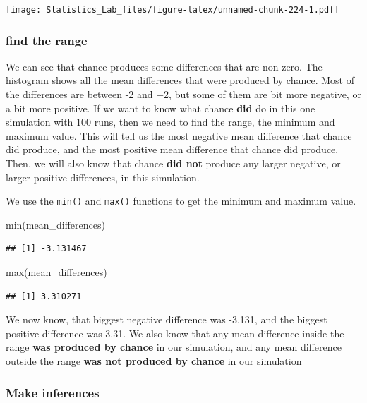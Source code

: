 \documentclass[
]{book}
\newenvironment{Shaded}{\begin{snugshade}}{\end{snugshade}}
\newcommand{\FunctionTok}[1]{\textcolor[rgb]{0.00,0.00,0.00}{#1}}
\newcommand{\NormalTok}[1]{#1}
\begin{document}
\texttt{[image: Statistics\_Lab\_files/figure-latex/unnamed-chunk-224-1.pdf]}

\hypertarget{find-the-range}{%
\subsubsection{find the range}\label{find-the-range}}

We can see that chance produces some differences that are non-zero. The histogram shows all the mean differences that were produced by chance. Most of the differences are between -2 and +2, but some of them are bit more negative, or a bit more positive. If we want to know what chance \textbf{did} do in this one simulation with 100 runs, then we need to find the range, the minimum and maximum value. This will tell us the most negative mean difference that chance did produce, and the most positive mean difference that chance did produce. Then, we will also know that chance \textbf{did not} produce any larger negative, or larger positive differences, in this simulation.

We use the \texttt{min()} and \texttt{max()} functions to get the minimum and maximum value.

\begin{Shaded}
\begin{Highlighting}[]
\FunctionTok{min}\NormalTok{(mean\_differences)}
\end{Highlighting}
\end{Shaded}

\begin{verbatim}
## [1] -3.131467
\end{verbatim}

\begin{Shaded}
\begin{Highlighting}[]
\FunctionTok{max}\NormalTok{(mean\_differences)}
\end{Highlighting}
\end{Shaded}

\begin{verbatim}
## [1] 3.310271
\end{verbatim}

We now know, that biggest negative difference was -3.131, and the biggest positive difference was 3.31. We also know that any mean difference inside the range \textbf{was produced by chance} in our simulation, and any mean difference outside the range \textbf{was not produced by chance} in our simulation

\hypertarget{make-inferences}{%
\subsubsection{Make inferences}\label{make-inferences}}
\end{document}

